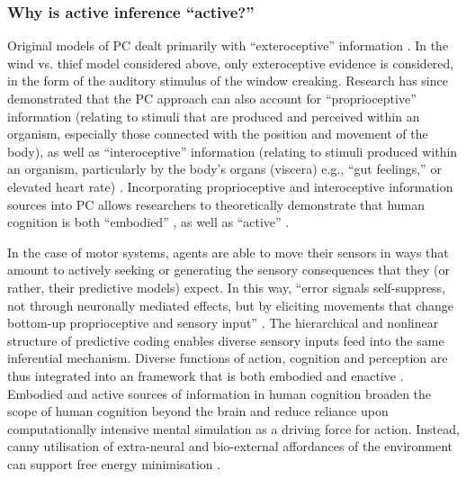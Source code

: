 \begin{CJK}{UTF8}{gbsn}
\subsubsection{Why is active inference ``active?''}
Original models of PC dealt primarily with ``exteroceptive'' information \citep[relating to stimuli that are external to an organism, i.e. visual, auditory, haptic perception][]{Rao1999,Friston2010}.  In the wind vs. thief model considered above, only exteroceptive evidence is considered, in the form of the auditory stimulus of the window creaking.  Research has since demonstrated that the PC approach can also account for ``proprioceptive'' information (relating to stimuli that are produced and perceived within an organism, especially those connected with the position and movement of the body), as well as ``interoceptive'' information (relating to stimuli produced within an organism, particularly by the body's organs (viscera) e.g., ``gut feelings,'' or elevated heart rate) \citep{Seth2013,FeldmanBarrett2015}.  Incorporating proprioceptive and interoceptive information sources into PC allows researchers to theoretically demonstrate that human cognition is both ``embodied'' \citep[inference is rooted in and contingent upon visceral, interoceptive information][]{Pezzulo2014}, as well as ``active'' \citep[in the sense that humans can move throughout the environment to reduce the discrepancy between proprioceptive predictions and actual body states, see][]{Friston2010,Clark2015}.

In the case of motor systems, agents are able to move their sensors in ways that amount to actively seeking or generating the sensory consequences that they (or rather, their predictive models) expect.  In this way, ``error signals self-suppress, not through neuronally mediated effects, but by eliciting movements that change bottom-up proprioceptive and sensory input'' \citep[][1349]{Friston2003}.  The hierarchical and nonlinear structure of predictive coding enables diverse sensory inputs feed into the same inferential mechanism.  Diverse functions of action, cognition and perception are thus integrated into an framework that is both embodied and enactive \citep{Friston2015}.  Embodied and active sources of information in human cognition broaden the scope of human cognition beyond the brain and reduce reliance upon computationally intensive mental simulation as a driving force for action.  Instead, canny utilisation of extra-neural and bio-external affordances of the environment can support free energy minimisation \citep{Clark2015}.


\end{CJK}
